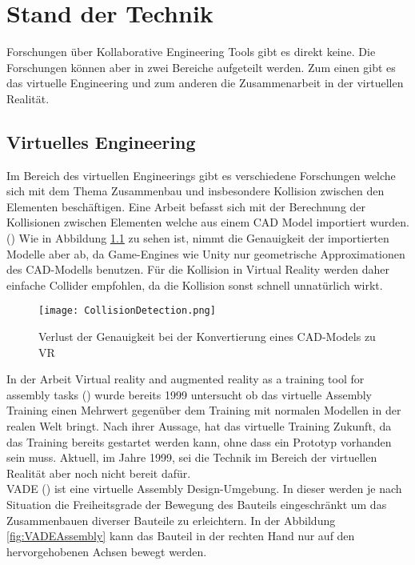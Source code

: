 \chapter{Stand der Technik}
\label{ch:StandDerTechnik}

Forschungen über Kollaborative Engineering Tools gibt es direkt keine. Die Forschungen können aber in zwei Bereiche aufgeteilt werden. Zum einen gibt es das virtuelle Engineering und zum anderen die Zusammenarbeit in der virtuellen Realität.

\section{Virtuelles Engineering}

Im Bereich des virtuellen Engineerings gibt es verschiedene Forschungen welche sich mit dem Thema Zusammenbau und insbesondere Kollision zwischen den Elementen beschäftigen.
Eine Arbeit befasst sich mit der Berechnung der Kollisionen zwischen Elementen welche aus einem CAD Model importiert wurden. (\cite{tching_interactive_2010})
Wie in Abbildung \ref{fig:LossOfAccuracy} zu sehen ist, nimmt die Genauigkeit der importierten Modelle aber ab, da Game-Engines wie Unity nur geometrische Approximationen des CAD-Modells benutzen. Für die Kollision in Virtual Reality werden daher einfache \grqq Collider\grqq{} empfohlen, da die Kollision sonst schnell unnatürlich wirkt.

\begin{figure}[h!]
	\centering
	\texttt{[image: CollisionDetection.png]}
	\caption{Verlust der Genauigkeit bei der Konvertierung eines CAD-Models zu VR}
	\label{fig:LossOfAccuracy}
\end{figure}

In der Arbeit \grqq Virtual reality and augmented reality as a training tool for assembly tasks\grqq{} (\cite{boud_virtual_1999}) wurde bereits 1999 untersucht ob das virtuelle Assembly Training einen Mehrwert gegenüber dem Training mit normalen Modellen in der realen Welt bringt. Nach ihrer Aussage, hat das virtuelle Training Zukunft, da das Training bereits gestartet werden kann, ohne dass ein Prototyp vorhanden sein muss. Aktuell, im Jahre 1999, sei die Technik im Bereich der virtuellen Realität aber noch nicht bereit dafür. \\

\noindent VADE (\cite{tirumali_vade:_1999}) ist eine virtuelle Assembly Design-Umgebung. In dieser werden je nach Situation die Freiheitsgrade der Bewegung des Bauteils eingeschränkt um das Zusammenbauen diverser Bauteile zu erleichtern. 
In der Abbildung \ref{fig:VADEAssembly} kann das Bauteil in der rechten Hand nur auf den hervorgehobenen Achsen bewegt werden.

